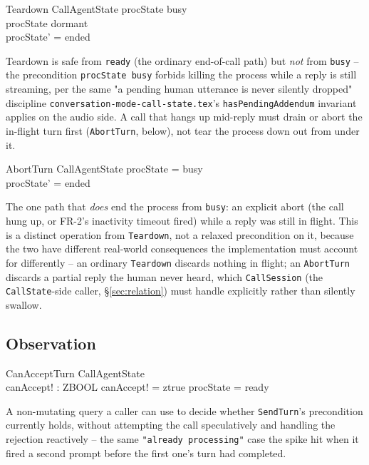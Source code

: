 \documentclass[a4paper,10pt,fleqn]{article}
\begin{document}
\begin{schema}{Teardown}
  \Delta CallAgentState
  \where
  procState \neq busy \\
  procState \neq dormant \\
  procState' = ended
\end{schema}

Teardown is safe from \texttt{ready} (the ordinary end-of-call path) but
\emph{not} from \texttt{busy} -- the precondition \texttt{procState \neq busy}
forbids killing the process while a reply is still streaming, per the same
"a pending human utterance is never silently dropped" discipline
\texttt{conversation-mode-call-state.tex}'s \texttt{hasPendingAddendum}
invariant applies on the audio side. A call that hangs up mid-reply must
drain or abort the in-flight turn first (\texttt{AbortTurn}, below), not
tear the process down out from under it.

\begin{schema}{AbortTurn}
  \Delta CallAgentState
  \where
  procState = busy \\
  procState' = ended
\end{schema}

The one path that \emph{does} end the process from \texttt{busy}: an explicit
abort (the call hung up, or FR-2's inactivity timeout fired) while a reply was
still in flight. This is a distinct operation from \texttt{Teardown}, not a
relaxed precondition on it, because the two have different real-world
consequences the implementation must account for differently -- an ordinary
\texttt{Teardown} discards nothing in flight; an \texttt{AbortTurn} discards a
partial reply the human never heard, which \texttt{CallSession} (the
\texttt{CallState}-side caller, \S\ref{sec:relation}) must handle explicitly
rather than silently swallow.

\subsection{Observation}

\begin{schema}{CanAcceptTurn}
  \Xi CallAgentState \\
  canAccept! : ZBOOL
  \where
  canAccept! = ztrue \iff procState = ready
\end{schema}

A non-mutating query a caller can use to decide whether \texttt{SendTurn}'s
precondition currently holds, without attempting the call speculatively and
handling the rejection reactively -- the same
\texttt{"already processing"} case the spike hit when it fired a second
prompt before the first one's turn had completed.
\end{document}
